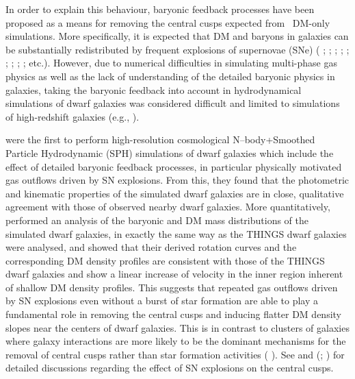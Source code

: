 \documentclass[natbib209]{emulateapj}
\begin{document}
In order to explain this behaviour, baryonic feedback processes have been proposed 
as a means for removing the central cusps expected
from \LCDM\ DM-only simulations. More specifically, it is expected that DM and baryons in
galaxies can be substantially redistributed by frequent explosions of supernovae
(SNe) (\citeauthor{Larson_1974}
\citeyear{Larson_1974}; \citeauthor{Navarro_1996} \citeyear{Navarro_1996};
\citeauthor{Dekel_2003} \citeyear{Dekel_2003}; \citeauthor{Mo_Mao_2004}
\citeyear{Mo_Mao_2004}; \citeauthor{Mashchenko_2008}
\citeyear{Mashchenko_2008}; \citeauthor{de_Souza_2011}
\citeyear{de_Souza_2011}; \citeauthor{Brook_2011} \citeyear{Brook_2011};
\citeauthor{Pontzen_2012} \citeyear{Pontzen_2012};
\citeauthor{2014MNRAS.437..415D} \citeyear{2014MNRAS.437..415D};
\citeauthor{2014ApJ...793...46O} \citeyear{2014ApJ...793...46O} etc.).
However, due to numerical difficulties in simulating
multi-phase gas physics as well as the lack of understanding of the detailed
baryonic physics in galaxies, taking the baryonic feedback into account in
hydrodynamical simulations of dwarf galaxies was considered difficult and limited to
simulations of high-redshift galaxies (e.g., \citeauthor{Mashchenko_2006}
\citeyear{Mashchenko_2006}).

\cite{Governato_2010} were the first to perform high-resolution cosmological
N--body+Smoothed Particle Hydrodynamic (SPH) simulations of dwarf galaxies which
include the effect of detailed baryonic feedback processes, in particular
physically motivated gas outflows driven by SN explosions. From this, they found
that the photometric and kinematic properties of the simulated dwarf galaxies
are in close, qualitative agreement with those of observed nearby dwarf galaxies.
More quantitatively, \cite{Oh_2011b} performed  an analysis of the baryonic
and DM mass distributions of the simulated dwarf galaxies, in exactly the same way 
as the THINGS dwarf galaxies were analysed, and showed that their derived rotation 
curves and the corresponding DM density profiles are consistent with those of the
THINGS dwarf galaxies and show a linear increase of velocity in the inner
region inherent of shallow DM density profiles. This suggests that
repeated gas outflows driven by SN explosions even without a burst of star
formation are able to play a fundamental role in removing the central cusps and
inducing flatter DM density slopes near the centers of dwarf galaxies.
This is in contrast to clusters of galaxies where galaxy interactions are more
likely to be the dominant mechanisms for the removal of central cusps rather
than star formation activities (\citeauthor{Richtler_2011}
\citeyear{Richtler_2011}). See \cite{Governato_2010} and
\citeauthor{Pontzen_2012} (\citeyear{Pontzen_2012}; \citeyear{Pontzen_2014})
for detailed discussions regarding the effect of SN explosions on the central cusps.
\end{document}
